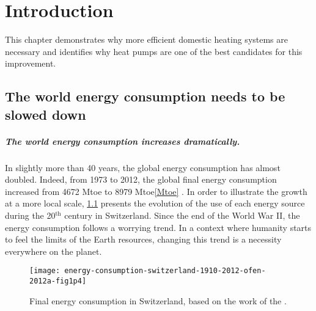 \chapter{Introduction}
\label{chap:intro}
\resetallacronyms

\begin{shaded}
  This chapter demonstrates why more efficient domestic heating systems
  are necessary and identifies why heat pumps are one of the best
  candidates for this improvement.
\end{shaded}

\section{The world energy consumption needs to be slowed down}
\label{sec:intro-slow-energy}


\paragraph{The world energy consumption increases dramatically.}In
slightly more than 40 years, the global energy consumption has almost
doubled. Indeed, from 1973 to 2012, the global final energy
consumption increased from 4672 Mtoe to 8979 Mtoe\cref{Mtoe}
\citep[p.\,28]{iea-2014a}. In order to
illustrate the growth at a more local scale,
\cref{fig:energy-consumption-ch-2012} presents the evolution of the
use of each energy source during the 20$^{\text{th}}$ century in
Switzerland. Since the end of the World War II, the energy consumption
follows a worrying trend. In a context where humanity starts to feel
the limits of the Earth resources, changing this trend is a necessity
everywhere on the planet.

\begin{figure}[htbp]
  \centering
  \texttt{[image: energy-consumption-switzerland-1910-2012-ofen-2012a-fig1p4]}
  \caption[Final energy consumption in Switzerland]
  {Final energy consumption in Switzerland, based on the work of the
    \citet[Fig.\,1, p.\,4]{ofen-2012a}.}
  \label{fig:energy-consumption-ch-2012}
\end{figure}

